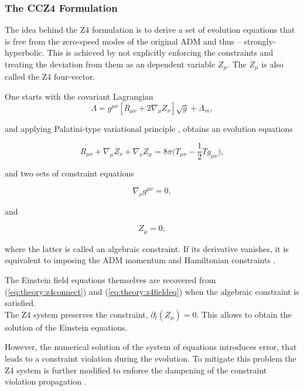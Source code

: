 \documentclass[11pt,a4paper,headinclude=true,DIV=14,BCOR=8mm,chapterprefix,listof=totoc,twoside,openright,abstracton]{scrbook}
\begin{document}
\subsubsection*{The CCZ4 Formulation}

The idea behind the Z4 formulation is to derive a set of evolution equations that is free from the zero-speed modes of the original ADM and thus -- strongly-hyperbolic. This is achieved by not explicitly enforcing the constraints and treating the deviation from them as an dependent variable $Z_{\mu}$. The $Z_{\mu}$ is also called the Z4 four-vector.

One starts with the covariant Lagrangian
\begin{equation}
    \Lambda = g^{\mu\nu}[R_{\mu\nu} + 2\nabla_{\mu}Z_{\nu}]\sqrt{g} + \Lambda_m,
\end{equation}

and applying Palatini-type variational principle \cite{Bona:2010is}, obtains an evolution equations

\begin{equation}
    R_{\mu\nu} + \nabla_{\mu}Z_{\nu} + \nabla_{\nu}Z_{\mu}=8\pi\Big(T_{\mu\nu} - \frac{1}{2}Tg_{\mu\nu}\Big),
    \label{eq:theory:z4fieldeq}
\end{equation}

and two sets of constraint equations

\begin{equation}
    \nabla_{\rho} g^{\mu\nu} = 0, 
    \label{eq:theory:z4connect}
\end{equation}

and

\begin{equation}
    Z_{\mu} = 0,
\end{equation}

where the latter is called an algebraic constraint. If its derivative vanishes, it is equivalent to imposing the ADM momentum and Hamiltonian constraints \cite{Bona:2009}. 

The Einstein field equations themselves are recovered from (\ref{eq:theory:z4connect}) and (\ref{eq:theory:z4fieldeq}) when the algebraic constraint is satisfied. \\

The Z4 system preserves the constraint, $\partial_t (Z_{\mu})= 0$. This allows to obtain the solution of the Einstein equations. 

However, the numerical solution of the system of equations introduces error, that leads to a constraint violation during the evolution. To mitigate this problem the Z4 system is further modified to enforce the dampening of the constraint violation propagation \cite{Gundlach:2005eh}.
\end{document}
